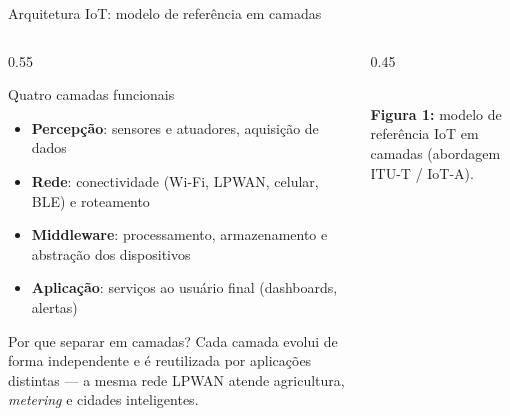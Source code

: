 \documentclass[aspectratio=169,11pt]{beamer}
\begin{document}
\begin{frame}{Arquitetura IoT: modelo de referência em camadas}
  \footnotesize
  \begin{columns}
    \begin{column}{0.55\textwidth}
      \begin{block}{Quatro camadas funcionais}
        \begin{itemize}
          \item \textbf{Percepção}: sensores e atuadores, aquisição de dados
          \item \textbf{Rede}: conectividade (Wi-Fi, LPWAN, celular, BLE) e roteamento
          \item \textbf{Middleware}: processamento, armazenamento e abstração dos dispositivos
          \item \textbf{Aplicação}: serviços ao usuário final (dashboards, alertas)
        \end{itemize}
      \end{block}
      \pause
      \begin{alertblock}{Por que separar em camadas?}
        Cada camada evolui de forma independente e é reutilizada por aplicações distintas --- a mesma rede LPWAN atende agricultura, \emph{metering} e cidades inteligentes.
      \end{alertblock}
    \end{column}
    \begin{column}{0.45\textwidth}
      \begin{center}
        \\[1mm]
        {\scriptsize \textbf{Figura 1:} modelo de referência IoT em camadas (abordagem ITU-T / IoT-A).}
      \end{center}
    \end{column}
  \end{columns}
\end{frame}
\end{document}
